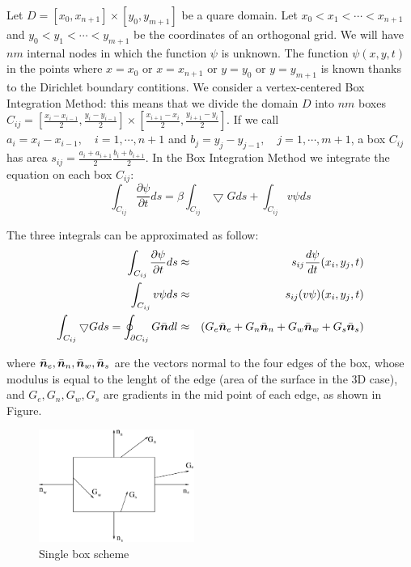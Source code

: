 \documentclass[a4paper,10pt]{article}
\newcommand{\ve}[1]{\mbox{\boldmath $ #1$}}
\begin{document}
Let $D = [x_0, x_{n+1}] \times [y_0, y_{m+1}]$ be a quare domain.
Let $ x_0 < x_1 < \cdots < x_{n+1} $ and $ y_0 < y_1 < \cdots < y_{m+1} $ be the coordinates of an orthogonal grid. We will have $nm$ internal nodes in which the function $\psi$ is unknown. The function $\psi(x, y, t)$ in the points where $x = x_0$ or $x = x_{n+1}$ or $y = y_0$ or $y = y_{m+1}$ is known thanks to the Dirichlet boundary contitions.
We consider a vertex-centered Box Integration Method: this means that we divide the domain $D$ into $nm$ boxes $C_{ij} = [\frac{x_i - x_{i-1}}{2}, \frac{y_i - y_{i-1}}{2}] \times
                [\frac{x_{i+1} - x_i}{2}, \frac{y_{i+1} - y_i}{2}] $.
If we call $a_i = x_i - x_{i-1}, \quad i = 1, \cdots, n+1$ and
$b_j = y_j - y_{j-1}, \quad j = 1, \cdots, m+1$, a box $C_{ij}$ has area
$s_{ij} = \frac{a_i+a_{i+1}}{2} \frac{b_i+b_{i+1}}{2}$.
In the Box Integration Method we integrate the equation on each box $C_{ij}$:
$$ \int_{C_{ij}} \frac{\partial \psi}{\partial t} ds = 
   \beta \int_{C_{ij}} \bigtriangledown G ds + 
   \int_{C_{ij}} v \psi ds $$

The three integrals can be approximated as follow:
\begin{eqnarray}
\int_{C_{ij}} \frac{\partial \psi}{\partial t} ds & \approx &
   s_{ij} \frac{d \psi}{dt}(x_i, y_j, t) \\
\int_{C_{ij}} v \psi ds & \approx & s_{ij} (v \psi)(x_i, y_j, t) \\
\int_{C_{ij}} \bigtriangledown G ds = \oint_{\partial C_{ij}} G \bar{\ve{n}} dl & \approx &
   (G_e \bar{\ve n}_e + G_n \bar{\ve n}_n + G_w \bar{\ve n}_w + G_s \bar{\ve n}_s) \label{green_int}
\end{eqnarray}

where $\bar{\ve n}_e, \bar{\ve n}_n, \bar{\ve n}_w, \bar{\ve n}_s$ are the vectors normal to the four edges of the box, whose modulus is equal to the lenght of the edge (area of the surface in the 3D case), and $G_e, G_n, G_w, G_s$ are gradients in the mid point of each edge, as shown in Figure.

\begin{figure}
 \label{fig:single_box}
\centerline{\includegraphics[width=2in] {box.eps}}
\caption{Single box scheme}
\end{figure}
\end{document}
